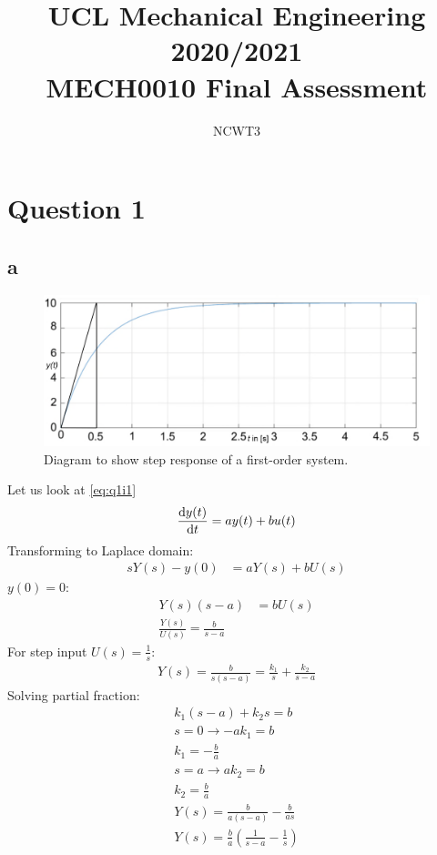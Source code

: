 \documentclass[11pt]{article}
\numberwithin{equation}{section}
\begin{document}
\title{\textbf{UCL Mechanical Engineering 2020/2021}\\MECH0010 Final Assessment}
\author{NCWT3}
\maketitle
\tableofcontents
\listoffigures
\section{Question 1}
\subsection{a}
\begin{figure}[H]
   \centering
   \includegraphics[width = 0.9 \textwidth]{./img/q1i1.png}
   \caption{Diagram to show step response of a first-order system.} 
   \label{fig:q1i1}
\end{figure}
Let us look at \ref{eq:q1i1}
\begin{equation}
    \frac{\dif y(t)}{\dif t} = ay(t) + b u(t)\label{eq:q1i1}
\end{equation}
Transforming to Laplace domain:
\begin{align}
    sY(s) - y(0) &= aY(s) + bU(s)
\end{align}
$y(0) = 0$:
\begin{align}
    Y(s)\left(s-a\right) &= bU(s)\\
    \frac{Y(s)}{U(s)} = \frac{b}{s-a}
\end{align}
For step input $U(s) = \frac{1}{s}$:
\begin{gather}
    Y(s) = \frac{b}{s(s-a)} = \frac{k_1}{s}+ \frac{k_2}{s-a}
\end{gather}
Solving partial fraction:
\begin{gather}
    k_1(s-a) + k_2 s = b\\
    s = 0 \rightarrow -ak_1 = b\\
    k_1 = -\frac{b}{a}\\
    s = a \rightarrow ak_2 = b\\
    k_2 = \frac{b}{a}\\
    Y(s) = \frac{b}{a(s-a)} - \frac{b}{as}\\
    Y(s) = \frac{b}{a}\left(\frac{1}{s-a}-\frac{1}{s}\right)
\end{gather}
\end{document}
